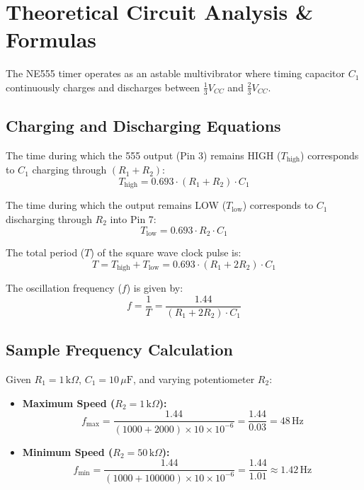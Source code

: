 \documentclass[11pt,a4paper]{article}
\begin{document}
\section{Theoretical Circuit Analysis \& Formulas}
The NE555 timer operates as an astable multivibrator where timing capacitor $C_1$ continuously charges and discharges between $\frac{1}{3}V_{CC}$ and $\frac{2}{3}V_{CC}$.

\subsection{Charging and Discharging Equations}
The time during which the 555 output (Pin 3) remains HIGH ($T_{\text{high}}$) corresponds to $C_1$ charging through $(R_1 + R_2)$:
\begin{equation}
T_{\text{high}} = 0.693 \cdot (R_1 + R_2) \cdot C_1
\end{equation}

The time during which the output remains LOW ($T_{\text{low}}$) corresponds to $C_1$ discharging through $R_2$ into Pin 7:
\begin{equation}
T_{\text{low}} = 0.693 \cdot R_2 \cdot C_1
\end{equation}

The total period ($T$) of the square wave clock pulse is:
\begin{equation}
T = T_{\text{high}} + T_{\text{low}} = 0.693 \cdot (R_1 + 2 R_2) \cdot C_1
\end{equation}

The oscillation frequency ($f$) is given by:
\begin{equation}
f = \frac{1}{T} = \frac{1.44}{(R_1 + 2 R_2) \cdot C_1}
\end{equation}

\subsection{Sample Frequency Calculation}
Given $R_1 = 1\,\text{k}\Omega$, $C_1 = 10\,\mu\text{F}$, and varying potentiometer $R_2$:
\begin{itemize}
    \item \textbf{Maximum Speed ($R_2 = 1\,\text{k}\Omega$):}
    \[
    f_{\text{max}} = \frac{1.44}{(1000 + 2000) \times 10 \times 10^{-6}} = \frac{1.44}{0.03} = 48\,\text{Hz}
    \]
    \item \textbf{Minimum Speed ($R_2 = 50\,\text{k}\Omega$):}
    \[
    f_{\text{min}} = \frac{1.44}{(1000 + 100000) \times 10 \times 10^{-6}} = \frac{1.44}{1.01} \approx 1.42\,\text{Hz}
    \]
\end{itemize}
\end{document}
